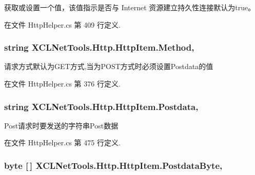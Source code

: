 获取或设置一个值，该值指示是否与 Internet 资源建立持久性连接默认为true。 



在文件 Http\-Helper.\-cs 第 409 行定义.

\hypertarget{class_x_c_l_net_tools_1_1_http_1_1_http_item_ac5086662fb0248c50436d33a38e9552d}{
\subsubsection[{Method}]{\setlength{\rightskip}{0pt plus 5cm}string X\-C\-L\-Net\-Tools.\-Http.\-Http\-Item.\-Method\hspace{0.3cm}{\ttfamily [get]}, {\ttfamily [set]}}}\label{class_x_c_l_net_tools_1_1_http_1_1_http_item_ac5086662fb0248c50436d33a38e9552d}


请求方式默认为\-G\-E\-T方式,当为\-P\-O\-S\-T方式时必须设置\-Postdata的值 



在文件 Http\-Helper.\-cs 第 376 行定义.

\hypertarget{class_x_c_l_net_tools_1_1_http_1_1_http_item_ace6cbdf79c4aab756c172d58380c03c2}{
\subsubsection[{Postdata}]{\setlength{\rightskip}{0pt plus 5cm}string X\-C\-L\-Net\-Tools.\-Http.\-Http\-Item.\-Postdata\hspace{0.3cm}{\ttfamily [get]}, {\ttfamily [set]}}}\label{class_x_c_l_net_tools_1_1_http_1_1_http_item_ace6cbdf79c4aab756c172d58380c03c2}


Post请求时要发送的字符串\-Post数据 



在文件 Http\-Helper.\-cs 第 475 行定义.

\hypertarget{class_x_c_l_net_tools_1_1_http_1_1_http_item_a7bf9bbbd8d1b1d30ef7e9708f5109914}{
\subsubsection[{Postdata\-Byte}]{\setlength{\rightskip}{0pt plus 5cm}byte \mbox{[}$\,$\mbox{]} X\-C\-L\-Net\-Tools.\-Http.\-Http\-Item.\-Postdata\-Byte\hspace{0.3cm}{\ttfamily [get]}, {\ttfamily [set]}}}\label{class_x_c_l_net_tools_1_1_http_1_1_http_item_a7bf9bbbd8d1b1d30ef7e9708f5109914}


